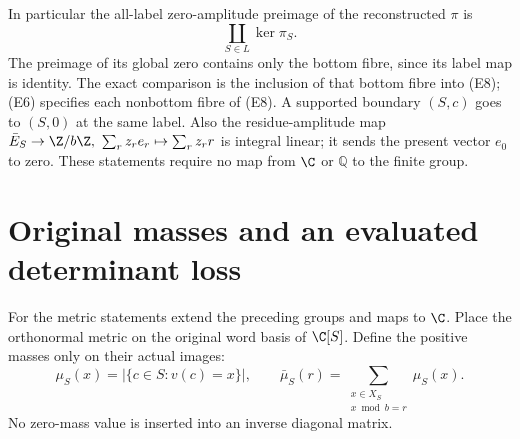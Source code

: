 \documentclass[11pt,a4paper]{article}
\begin{document}
In particular the all-label zero-amplitude preimage of the reconstructed
\(\pi\) is
\[
 \coprod_{S\in L}\ker\pi_S .
 \tag{E8}
\]
The preimage of its global zero contains only the bottom fibre, since its
label map is identity.  The exact comparison is the inclusion of that
bottom fibre into (E8); (E6) specifies each nonbottom fibre of (E8).
A supported boundary \((S,c)\) goes to \((S,0)\) at the same label.
Also the residue-amplitude map
\(\bar E_S\to\Z/b\Z,\ \sum_rz_re_r\mapsto\sum_rz_rr\) is integral linear;
it sends the present vector \(e_0\) to zero.  These statements require no
map from \(\C\) or \(\mathbb Q\) to the finite group.

\section{Original masses and an evaluated determinant loss}

For the metric statements extend the preceding groups and maps to \(\C\).
Place the orthonormal metric on the original word basis of \(\C[S]\).
Define the positive masses only on their actual images:
\[
 \mu_S(x)=|\{c\in S:v(c)=x\}|,\qquad
 \bar\mu_S(r)=\sum_{\substack{x\in X_S\\x\bmod b=r}}\mu_S(x).
 \tag{E9}
\]
No zero-mass value is inserted into an inverse diagonal matrix.
\end{document}
